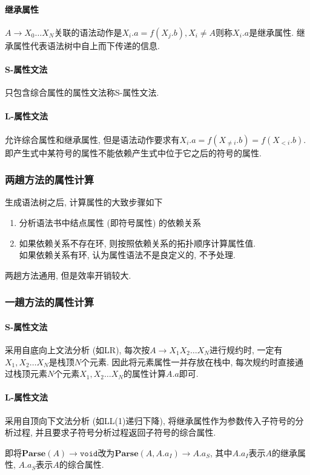 \documentclass{ctexart}
\begin{document}
\paragraph{继承属性} $A \to X_0 \ldots X_N$关联的语法动作是$X_i.a = f(X_j.b),X_i \neq A$则称$X_i.a$是继承属性.
    继承属性代表语法树中自上而下传递的信息.
\paragraph{S-属性文法} 只包含综合属性的属性文法称S-属性文法.
\paragraph{L-属性文法} 允许综合属性和继承属性, 但是语法动作要求有$X_i.a = f(X_{\neq i}.b) =f(X_{< i}.b)$.
    即产生式中某符号的属性不能依赖产生式中位于它之后的符号的属性.

\subsubsection{两趟方法的属性计算}
    生成语法树之后, 计算属性的大致步骤如下
    \begin{enumerate}
        \item 分析语法书中结点属性 (即符号属性) 的依赖关系
        \item 如果依赖关系不存在环, 则按照依赖关系的拓扑顺序计算属性值.\\
        如果依赖关系有环, 认为属性语法不是良定义的, 不予处理.\par
    \end{enumerate}
    两趟方法通用, 但是效率开销较大.

\subsubsection{一趟方法的属性计算}
\paragraph{S-属性文法} 采用自底向上文法分析 (如LR), 每次按$A \to X_1 X_2 \ldots X_N$进行规约时, 一定有$X_1, X_2 \ldots X_N$是栈顶$N$个元素.
    因此将元素属性一并存放在栈中, 每次规约时直接通过栈顶元素$N$个元素$X_1, X_2\ldots X_N$的属性计算$A.a$即可.
\paragraph{L-属性文法} \label{onepass-l-attr-grammar} 采用自顶向下文法分析 (如LL(1)递归下降),
    将继承属性作为参数传入子符号的分析过程, 并且要求子符号分析过程返回子符号的综合属性.\par
    即将$\mathbf{Parse}(A) \to \mathtt{void}$改为$\mathbf{Parse}(A, A.a_I) \to A.a_S$, 其中$A.a_I$表示$A$的继承属性, $A.a_S$表示$A$的综合属性.
\end{document}
